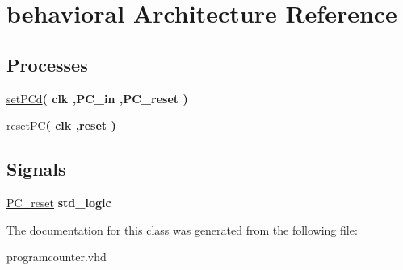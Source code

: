 \hypertarget{classpc_1_1behavioral}{\section{behavioral \-Architecture \-Reference}
\label{classpc_1_1behavioral}
}
\*
\*
\subsection*{\-Processes}
 \begin{DoxyCompactItemize}
\item 
\hypertarget{classpc_1_1behavioral_a332633eaeaa8c626e83ca70d41e3977b}{\hyperlink{classpc_1_1behavioral_a332633eaeaa8c626e83ca70d41e3977b}{set\-P\-Cd}{\bfseries  ( {\bfseries clk  ,\-P\-C\-\_\-in ,\-P\-C\-\_\-reset } )}}\label{classpc_1_1behavioral_a332633eaeaa8c626e83ca70d41e3977b}

\item 
\hypertarget{classpc_1_1behavioral_a38ebb9e0673575be5e25930948caff33}{\hyperlink{classpc_1_1behavioral_a38ebb9e0673575be5e25930948caff33}{reset\-P\-C}{\bfseries  ( {\bfseries clk  ,reset } )}}\label{classpc_1_1behavioral_a38ebb9e0673575be5e25930948caff33}

\end{DoxyCompactItemize}
\subsection*{\-Signals}
 \begin{DoxyCompactItemize}
\item 
\hypertarget{classpc_1_1behavioral_abbc54b6aa1aa953752a7f9782592d678}{\hyperlink{classpc_1_1behavioral_abbc54b6aa1aa953752a7f9782592d678}{\-P\-C\-\_\-reset} {\bfseries std\-\_\-logic } }\label{classpc_1_1behavioral_abbc54b6aa1aa953752a7f9782592d678}

\end{DoxyCompactItemize}


\-The documentation for this class was generated from the following file\-:\begin{DoxyCompactItemize}
\item 
programcounter.\-vhd\end{DoxyCompactItemize}
